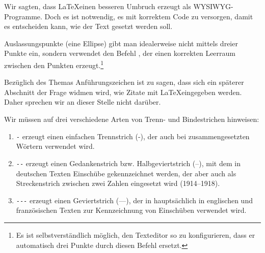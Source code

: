 Wir sagten, dass \LaTeX einen besseren Umbruch erzeugt als WYSIWYG-Programme. Doch es ist  notwendig, es mit korrektem Code zu versorgen, damit es entscheiden kann, wie der Text gesetzt werden soll.



Auslassungspunkte (eine Ellipse) gibt man idealerweise nicht mittels dreier Punkte ein, sondern verwendet den Befehl , der einen korrekten Leerraum zwischen den Punkten erzeugt.\footnote{Es ist selbstverständlich möglich, den Texteditor so zu konfigurieren, dass er automatisch drei Punkte durch diesen Befehl ersetzt.}

Bezüglich des Themas Anführungszeichen ist zu sagen, dass sich ein späterer Abschnitt der Frage widmen wird, wie Zitate  mit \LaTeX eingegeben werden. Daher sprechen wir an dieser Stelle nicht darüber.


Wir müssen auf drei verschiedene Arten von Trenn- und Bindestrichen hinweisen\label{tirets}:
\begin{enumerate}
\item \verb|-| erzeugt einen einfachen Trennstrich (-), der auch bei zusammengesetzten Wörtern verwendet wird.
\item \verb|--| erzeugt einen Gedankenstrich bzw. Halbgeviertstrich (--), mit dem in deutschen Texten Einschübe gekennzeichnet werden, der aber auch als Streckenstrich zwischen zwei Zahlen eingesetzt wird (1914--1918).
\item \verb|---| erzeugt einen Geviertstrich (---), der in hauptsächlich in englischen und französischen Texten zur Kennzeichnung von Einschüben verwendet wird.
\end{enumerate}

